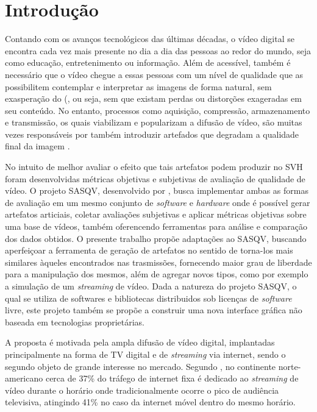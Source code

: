 \chapter{Introdução}

Contando com os avanços tecnológicos das últimas décadas, o vídeo digital se encontra cada vez mais presente no dia a dia das pessoas ao redor do mundo, seja como educação, entretenimento ou informação.
Além de acessível, também é necessário que o vídeo chegue a essas pessoas com um nível de qualidade que as possibilitem contemplar e interpretar as imagens de forma natural, sem exasperação do (, ou seja, sem que existam perdas ou distorções exageradas em seu conteúdo.
No entanto, processos como aquisição, compressão, armazenamento e transmissão, os quais viabilizam e popularizam a difusão de vídeo, são muitas vezes responsáveis por também introduzir artefados que degradam a qualidade final da imagem \cite{daronco}.

No intuito de melhor avaliar o efeito que tais artefatos podem produzir no SVH foram desenvolvidas métricas objetivas e subjetivas de avaliação de qualidade de vídeo. O projeto SASQV, desenvolvido por \cite{sasqv}, busca implementar ambas as formas de avaliação em um mesmo conjunto de \emph{software} e \emph{hardware} onde é possível gerar artefatos articiais, coletar avaliações subjetivas e aplicar métricas objetivas sobre uma base de vídeos, também oferencendo ferramentas para análise e comparação dos dados obtidos. O presente trabalho propõe adaptações ao SASQV, buscando aperfeiçoar a ferramenta de  geração de artefatos no sentido de torna-los mais similares àqueles encontrados nas trasmissões, fornecendo maior grau de liberdade para a manipulação dos mesmos, além de agregar novos tipos, como por exemplo a simulação de um \emph{streaming} de vídeo. Dada a natureza do projeto SASQV, o qual se utiliza de softwares e bibliotecas distribuidos sob licenças de \emph{software} livre, este projeto também se propõe a construir uma nova interface gráfica não baseada em tecnologias proprietárias.

A proposta é motivada pela ampla difusão de vídeo digital, implantadas principalmente na forma de TV digital e de \emph{streaming} via internet, sendo o segundo objeto de grande interesse no mercado. Segundo \cite{sandvinereport}, no continente norte-americano cerca de 37\% do tráfego de internet fixa é dedicado ao \emph{streaming} de vídeo durante o horário onde tradicionalmente ocorre o pico de audiência televisiva, atingindo 41\% no caso da internet móvel dentro do mesmo horário.

